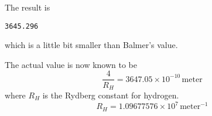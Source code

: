 \documentclass[12pt]{article}
\begin{document}
\medskip
\noindent
The result is
{\footnotesize
\begin{verbatim}
3645.296
\end{verbatim}
}

\noindent
which is a little bit smaller than Balmer's value.

\bigskip
\noindent
The actual value is now known to be
\begin{equation*}
\frac{4}{R_H}=3647.05\times10^{-10}\,\text{meter}
\end{equation*}
where $R_H$ is the Rydberg constant for hydrogen.
\begin{equation*}
R_H=1.09677576\times10^7\,\text{meter}^{-1}
\end{equation*}
\end{document}
